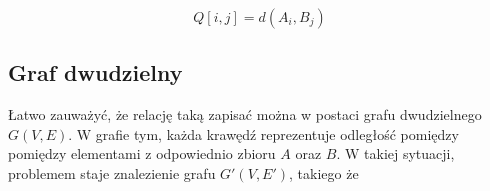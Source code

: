 \begin{equation}
  Q[i, j] = d(A_i, B_j)\label{eq:hungarian-logs}
\end{equation}

\todo{}

\subsection{Graf dwudzielny}

Łatwo zauważyć, że relację taką zapisać można w postaci grafu dwudzielnego $G(V, E)$.
W grafie tym, każda krawędź reprezentuje odległość pomiędzy pomiędzy elementami
z odpowiednio zbioru $A$ oraz $B$.
W takiej sytuacji, problemem staje znalezienie grafu $G'(V, E')$, takiego że \todo{}
